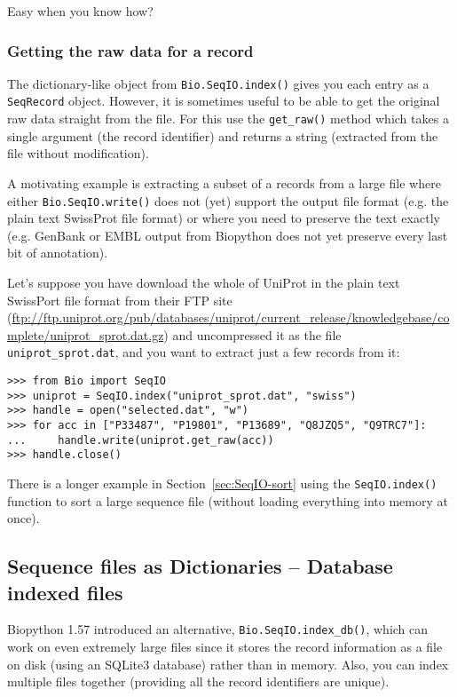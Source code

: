 \documentclass{report}
\begin{document}
\noindent Easy when you know how?

\subsubsection{Getting the raw data for a record}
\label{sec:seqio-index-getraw}

The dictionary-like object from \verb|Bio.SeqIO.index()| gives you each
entry as a \verb|SeqRecord| object. However, it is sometimes useful to
be able to get the original raw data straight from the file. For this
use the \verb|get_raw()| method which takes a
single argument (the record identifier) and returns a string (extracted
from the file without modification).

A motivating example is extracting a subset of a records from a large
file where either \verb|Bio.SeqIO.write()| does not (yet) support the
output file format (e.g. the plain text SwissProt file format) or
where you need to preserve the text exactly (e.g. GenBank or EMBL
output from Biopython does not yet preserve every last bit of
annotation).

Let's suppose you have download the whole of UniProt in the plain
text SwissPort file format from their FTP site
(\url{ftp://ftp.uniprot.org/pub/databases/uniprot/current_release/knowledgebase/complete/uniprot_sprot.dat.gz})
and uncompressed it as the file \verb|uniprot_sprot.dat|, and you
want to extract just a few records from it:

\begin{verbatim}
>>> from Bio import SeqIO
>>> uniprot = SeqIO.index("uniprot_sprot.dat", "swiss")
>>> handle = open("selected.dat", "w")
>>> for acc in ["P33487", "P19801", "P13689", "Q8JZQ5", "Q9TRC7"]:
...     handle.write(uniprot.get_raw(acc))
>>> handle.close()
\end{verbatim}

There is a longer example in Section~\ref{sec:SeqIO-sort} using the
\verb|SeqIO.index()| function to sort a large sequence file (without
loading everything into memory at once).

\subsection{Sequence files as Dictionaries -- Database indexed files}
\label{sec:SeqIO-index-db}

Biopython 1.57 introduced an alternative, \verb|Bio.SeqIO.index_db()|, which
can work on even extremely large files since it stores the record information
as a file on disk (using an SQLite3 database) rather than in memory. Also,
you can index multiple files together (providing all the record identifiers
are unique).
\end{document}
